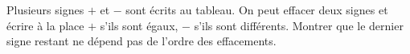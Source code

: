 Plusieurs signes $+$ et $-$ sont écrits au tableau. On peut effacer deux signes et écrire à la place $+$ s'ils sont égaux, $-$ s'ils sont différents. Montrer que le dernier signe restant ne dépend pas de l'ordre des effacements.
